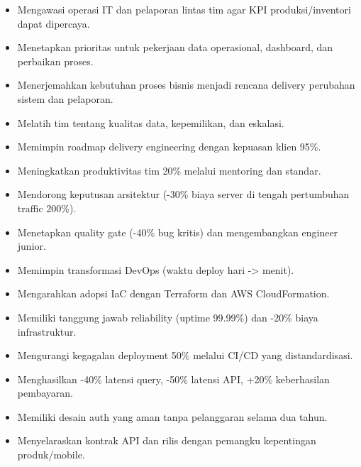 \begin{itemize}
  \item Mengawasi operasi IT dan pelaporan lintas tim agar KPI produksi/inventori dapat dipercaya.
  \item Menetapkan prioritas untuk pekerjaan data operasional, dashboard, dan perbaikan proses.
  \item Menerjemahkan kebutuhan proses bisnis menjadi rencana delivery perubahan sistem dan pelaporan.
  \item Melatih tim tentang kualitas data, kepemilikan, dan eskalasi.
\end{itemize}
\vspace{4pt}
\begin{itemize}
  \item Memimpin roadmap delivery engineering dengan kepuasan klien 95\%.
  \item Meningkatkan produktivitas tim 20\% melalui mentoring dan standar.
  \item Mendorong keputusan arsitektur (-30\% biaya server di tengah pertumbuhan traffic 200\%).
  \item Menetapkan quality gate (-40\% bug kritis) dan mengembangkan engineer junior.
\end{itemize}
\vspace{4pt}
\begin{itemize}
  \item Memimpin transformasi DevOps (waktu deploy hari -> menit).
  \item Mengarahkan adopsi IaC dengan Terraform dan AWS CloudFormation.
  \item Memiliki tanggung jawab reliability (uptime 99.99\%) dan -20\% biaya infrastruktur.
  \item Mengurangi kegagalan deployment 50\% melalui CI/CD yang distandardisasi.
\end{itemize}
\vspace{4pt}
\begin{itemize}
  \item Menghasilkan -40\% latensi query, -50\% latensi API, +20\% keberhasilan pembayaran.
  \item Memiliki desain auth yang aman tanpa pelanggaran selama dua tahun.
  \item Menyelaraskan kontrak API dan rilis dengan pemangku kepentingan produk/mobile.
\end{itemize}

